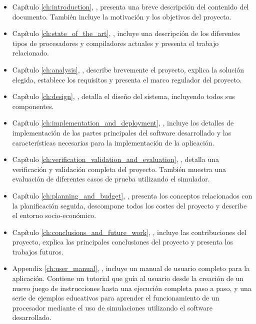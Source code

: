 \begin{itemize}

\item Capítulo \ref{ch:introduction}, \textit{}, presenta una breve descripción del contenido del documento. También incluye la motivación y los objetivos del proyecto.

\item Capítulo \ref{ch:state_of_the_art}, \textit{}, incluye una descripción de los diferentes tipos de procesadores y compiladores actuales y presenta el trabajo relacionado.

\item Capítulo \ref{ch:analysis}, \textit{}, describe brevemente el proyecto, explica la solución elegida, establece los requisitos y presenta el marco regulador del proyecto.

\item Capítulo \ref{ch:design}, \textit{}, detalla el diseño del sistema, incluyendo todos sus componentes.

\item Capítulo \ref{ch:implementation_and_deployment}, \textit{}, incluye los detalles de implementación de las partes principales del software desarrollado y las características necesarias para la implementación de la aplicación.

\item Capítulo \ref{ch:verification_validation_and_evaluation}, \textit{}, detalla una verificación y validación completa del proyecto. También muestra una evaluación de diferentes casos de prueba utilizando el simulador.

\item Capítulo \ref{ch:planning_and_budget}, \textit{}, presenta los conceptos relacionados con la planificación seguida, descompone todos los costes del proyecto y describe el entorno socio-económico.

\item Capítulo \ref{ch:conclusions_and_future_work}, \textit{}, incluye las contribuciones del proyecto, explica las principales conclusiones del proyecto y presenta los trabajos futuros.

\item Appendix \ref{ch:user_manual}, \textit{}, incluye un manual de usuario completo para la aplicación. Contiene un tutorial que guía al usuario desde la creación de un nuevo juego de instrucciones hasta una ejecución completa paso a paso, y una serie de ejemplos educativos para aprender el funcionamiento de un procesador mediante el uso de simulaciones utilizando el software desarrollado. 

\end{itemize}

